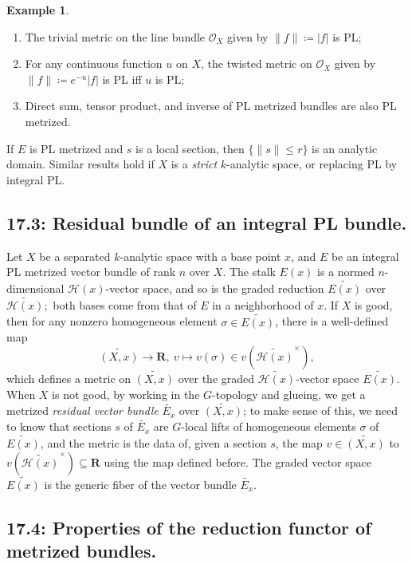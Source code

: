 \documentclass[12pt,reqno]{amsart}
\theoremstyle{definition}
\newtheorem{example}[theorem]{Example}
\theoremstyle{remark}
\theoremstyle{citedrem}
\theoremstyle{cited}
\theoremstyle{citeddef}
\theoremstyle{step}
\begin{document}
\begin{example}
    \begin{enumerate}
        \item The trivial metric on the line bundle $\mathcal{O}_X$ given by $\|f\| \coloneqq |f|$ is PL; 
        \item For any continuous function $u$ on $X$, the twisted metric on $\mathcal{O}_X$ given by $\|f\| \coloneqq e^{-u}|f|$ is PL iff $u$ is PL;
        \item Direct sum, tensor product, and inverse of PL metrized bundles are also PL metrized. 
    \end{enumerate}
\end{example}

If $E$ is PL metrized and $s$ is a local section, then $\{\|s\| \leq r\}$ is an analytic domain. Similar results hold if $X$ is a \emph{strict} $k$-analytic space, or replacing PL by integral PL. 

\subsection*{17.3: Residual bundle of an integral PL bundle. }Let $X$ be a separated $k$-analytic space with a base point $x$, and $E$ be an integral PL metrized vector bundle of rank $n$ over $X$. The stalk $E(x)$ is a normed $n$-dimensional $\mathcal{H}(x)$-vector space, and so is the graded reduction $\widetilde{E(x)}$ over $\widetilde{\mathcal{H}(x)};$ both bases come from that of $E$ in a neighborhood of $x$. If $X$ is good, then for any nonzero homogeneous element $\sigma \in \widetilde{E(x)}$, there is a well-defined map \[\widetilde{(X,x)} \to \mathbf{R}, \ v \mapsto v(\sigma) \in v(\widetilde{\mathcal{H}(x)}^\times),\] which defines a metric on $\widetilde{(X,x)}$ over the graded $\widetilde{\mathcal{H}(x)}$-vector space $\widetilde{E(x)}.$ When $X$ is not good, by working in the $G$-topology and glueing, we get a metrized \emph{residual vector bundle} $\widetilde{E_x}$ over $\widetilde{(X,x)}$; to make sense of this, we need to know that sections $s$ of $\widetilde{E_x}$ are $G$-local lifts of homogeneous elements $\sigma$ of $\widetilde{E(x)}$, and the metric is the data of, given a section $s$, the map $v \in \widetilde{(X,x)}$ to $v(\widetilde{\mathcal{H}(x)}^\times) \subseteq \mathbf{R}$ using the map defined before. The graded vector space $\widetilde{E(x)}$ is the generic fiber of the vector bundle $\widetilde{E_x}$. 

\subsection*{17.4: Properties of the reduction functor of metrized bundles. }
\end{document}
